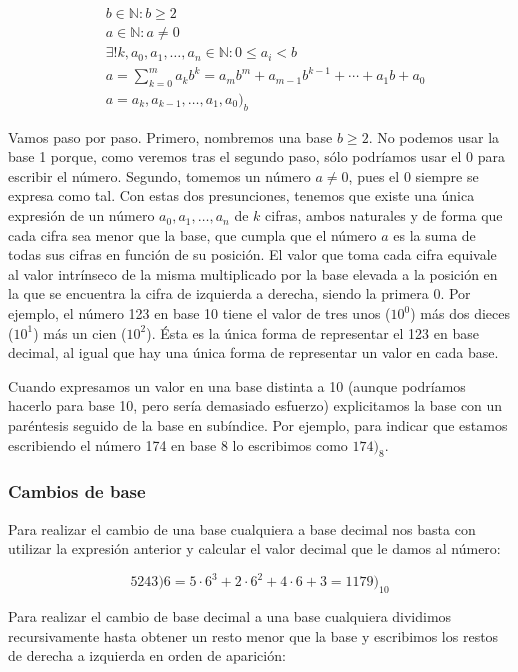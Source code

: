 \begin{align*}
	& b \in\mathbb{N} : b \geq 2 \\
	& a \in\mathbb{N} : a \neq 0 \\
	& \exists! k, a_0, a_1,\ldots,a_n \in\mathbb{N} : 0 \leq a_i < b \\
	& a = \sum_{k=0}^{m} a_kb^k = a_mb^m + a_{m-1}b^{k-1} + \cdots + a_1b + a_0 \\
	& a = a_k, a_{k-1}, \ldots, a_1, a_0 \big)_b
\end{align*}

Vamos paso por paso.
Primero, nombremos una base $b \geq 2$.
No podemos usar la base 1 porque, como veremos tras el segundo paso, sólo podríamos usar el 0 para escribir el número.
Segundo, tomemos un número $a \neq 0$, pues el 0 siempre se expresa como tal.
Con estas dos presunciones, tenemos que existe una única expresión de un número $a_0, a_1,\ldots,a_n$ de $k$ cifras, ambos naturales y de forma que cada cifra sea menor que la base, que cumpla que el número $a$ es la suma de todas sus cifras en función de su posición.
El valor que toma cada cifra equivale al valor intrínseco de la misma multiplicado por la base elevada a la posición en la que se encuentra la cifra de izquierda a derecha, siendo la primera 0.
Por ejemplo, el número 123 en base 10 tiene el valor de tres unos ($10^0$) más dos dieces ($10^1$) más un cien ($10^2$).
Ésta es la única forma de representar el 123 en base decimal, al igual que hay una única forma de representar un valor en cada base.

Cuando expresamos un valor en una base distinta a 10 (aunque podríamos hacerlo para base 10, pero sería demasiado esfuerzo) explicitamos la base con un paréntesis seguido de la base en subíndice.
Por ejemplo, para indicar que estamos escribiendo el número 174 en base 8 lo escribimos como $174\big)_8$.

\subsubsection{Cambios de base}

Para realizar el cambio de una base cualquiera a base decimal nos basta con utilizar la expresión anterior y calcular el valor decimal que le damos al número:

\[5243\big)6 = 5 \cdot 6^3 + 2 \cdot 6^2 + 4 \cdot 6 + 3 = 1179\big)_{10}\]

Para realizar el cambio de base decimal a una base cualquiera dividimos recursivamente hasta obtener un resto menor que la base y escribimos los restos de derecha a izquierda en orden de aparición:

